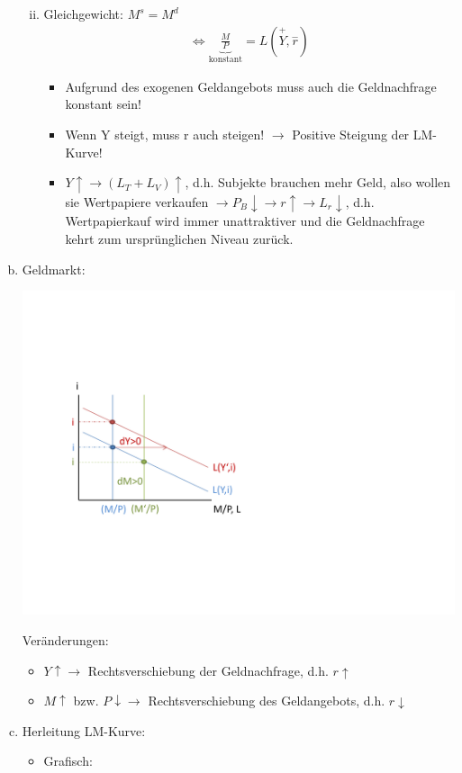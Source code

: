 \documentclass{scrartcl}
\begin{document}
\begin{enumerate}[(a)]
\begin{enumerate}[(i)]
\begin{itemize}
\begin{itemize}
      \end{itemize}
    \end{itemize}
    \item Gleichgewicht: $M^s=M^d $
    \begin{align*}
      \Leftrightarrow \underbrace{\frac{M}{P}}_\text{konstant}=L(\overset{+}{Y},\overset{-}{r})
    \end{align*}
    \begin{itemize}
      \item Aufgrund des exogenen Geldangebots muss auch die Geldnachfrage konstant sein!
      \item Wenn Y steigt, muss r auch steigen! $\rightarrow$ Positive Steigung der LM-Kurve!
      \item $Y\uparrow\rightarrow (L_T+L_V)\uparrow$, d.h. Subjekte brauchen mehr Geld, also wollen sie Wertpapiere verkaufen $\rightarrow P_B \downarrow \rightarrow r \uparrow \rightarrow L_r \downarrow$, d.h. Wertpapierkauf wird immer unattraktiver und die Geldnachfrage kehrt zum urspr\"{u}nglichen Niveau zur\"{u}ck.
    \end{itemize}
  \end{enumerate}
  \item Geldmarkt:
  \begin{center}
  \includegraphics[width=.5\textwidth]{Bilder/geldmarkt.pdf}
  \end{center}
  Ver\"{a}nderungen:
  \begin{itemize}
    \item $Y \uparrow \rightarrow$ Rechtsverschiebung der Geldnachfrage, d.h. $r\uparrow$
    \item $M\uparrow$ bzw. $P \downarrow \rightarrow$ Rechtsverschiebung des Geldangebots, d.h. $r \downarrow$
  \end{itemize}
  \item Herleitung LM-Kurve:
  \begin{itemize}
    \item Grafisch:
  \begin{center}

\end{center}
\end{itemize}
\end{enumerate}
\end{document}
